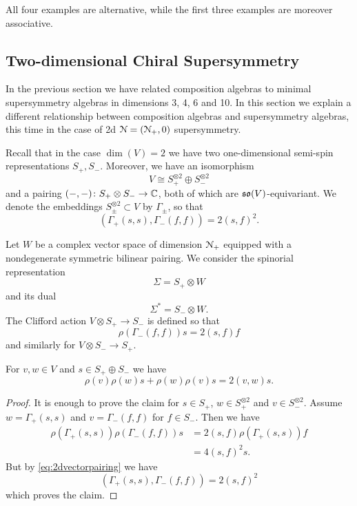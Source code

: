 \documentclass[10pt, oneside]{article}
\begin{document}
All four examples are alternative, while the first three examples are moreover associative.

\subsection{Two-dimensional Chiral Supersymmetry} \label{sec:2dchiral}

In the previous section we have related composition algebras to minimal supersymmetry algebras in dimensions 3, 4, 6 and 10. In this section we explain a different relationship between composition algebras and supersymmetry algebras, this time in the case of 2d $\mathcal N=(\mathcal N_+, 0)$ supersymmetry.

Recall that in the case $\dim(V) = 2$ we have two one-dimensional semi-spin representations $S_+, S_-$. Moreover, we have an isomorphism
\[V\cong S_+^{\otimes 2}\oplus S_-^{\otimes 2}\]
and a pairing $( -, -)\colon S_+\otimes S_-\rightarrow \mathbb C$, both of which are $\mathfrak{so}(V)$-equivariant. We denote the embeddings $S_{\pm}^{\otimes 2}\subset V$ by $\Gamma_{\pm}$, so that
\begin{equation}
(\Gamma_+(s, s), \Gamma_-(f, f)) = 2(s, f)^2.
\label{eq:2dvectorpairing}
\end{equation}

Let $W$ be a complex vector space of dimension $\mathcal N_+$ equipped with a nondegenerate symmetric bilinear pairing. We consider the spinorial representation
\[\Sigma = S_+\otimes W\]
and its dual
\[\Sigma^* = S_-\otimes W.\]
The Clifford action $V\otimes S_+\rightarrow S_-$ is defined so that
\[\rho(\Gamma_-(f, f)) s = 2(s, f) f\]
and similarly for $V\otimes S_-\rightarrow S_+$.

\begin{prop}
For $v,w\in V$ and $s\in S_+\oplus S_-$ we have
\[\rho(v)\rho(w)s + \rho(w)\rho(v) s = 2(v, w) s.\]
\end{prop}
\begin{proof}
It is enough to prove the claim for $s\in S_+$, $w\in S_+^{\otimes 2}$ and $v\in S_-^{\otimes 2}$. Assume $w=\Gamma_+(s, s)$ and $v = \Gamma_-(f, f)$ for $f\in S_-$. Then we have
\begin{align*}
\rho(\Gamma_+(s, s)) \rho(\Gamma_-(f, f)) s &= 2(s, f) \rho(\Gamma_+(s, s)) f \\
&= 4(s, f)^2 s.
\end{align*}
But by \eqref{eq:2dvectorpairing} we have
\[(\Gamma_+(s, s), \Gamma_-(f, f)) = 2(s, f)^2\]
which proves the claim.
\end{proof}
\end{document}
